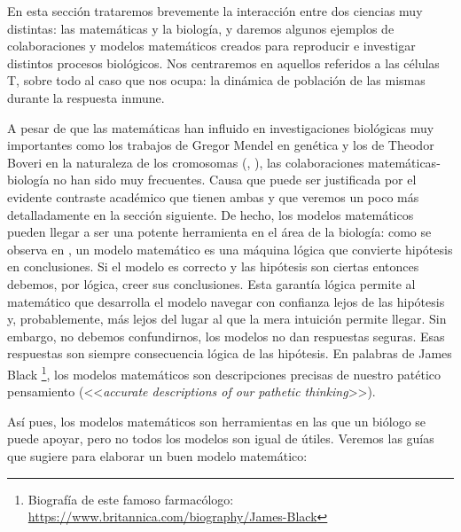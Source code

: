 En esta sección trataremos brevemente la interacción entre dos ciencias muy distintas: las matemáticas y la biología, y daremos algunos ejemplos de colaboraciones y modelos matemáticos creados para reproducir e investigar distintos procesos biológicos. Nos centraremos en aquellos referidos a las células T, sobre todo al caso que nos ocupa: la dinámica de población de las mismas durante la respuesta inmune.

A pesar de que las matemáticas han influido en investigaciones biológicas muy importantes como los trabajos de Gregor Mendel en genética y los de Theodor Boveri en la naturaleza de los cromosomas (\cite{mathsModInmu}, \cite{esteban2003mendel}), las colaboraciones matemáticas-biología no han sido muy frecuentes. Causa que puede ser justificada por el evidente contraste académico que tienen ambas y que veremos un poco más detalladamente en la sección siguiente. De hecho, los modelos matemáticos pueden llegar a ser una potente herramienta en el área de la biología: como se observa en \cite{Gunawardena2014}, un modelo matemático es una máquina lógica que convierte hipótesis en conclusiones. Si el modelo es correcto y las hipótesis son ciertas entonces debemos, por lógica, creer sus conclusiones. Esta garantía lógica permite al matemático que desarrolla el modelo navegar con confianza lejos de las hipótesis y, probablemente, más lejos del lugar al que la mera intuición permite llegar. Sin embargo, no debemos confundirnos, los modelos no dan respuestas seguras. Esas respuestas son siempre consecuencia lógica de las hipótesis. En palabras de James Black \footnote{Biografía de este famoso farmacólogo: \url{https://www.britannica.com/biography/James-Black}}, los modelos matemáticos son descripciones precisas de nuestro patético pensamiento (<<\textit{accurate descriptions of our pathetic thinking}>>).

Así pues, los modelos matemáticos son herramientas en las que un biólogo se puede apoyar, pero no todos los modelos son igual de útiles. Veremos las guías que sugiere \cite{Gunawardena2014} para elaborar un buen modelo matemático:

